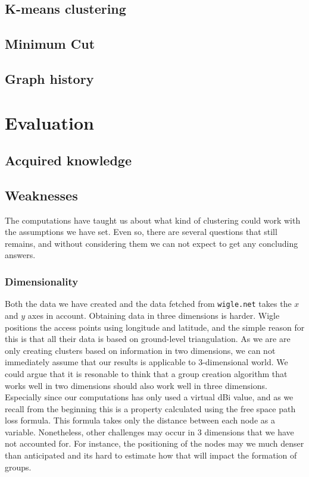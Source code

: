 
\subsection{K-means clustering}

\subsection{Minimum Cut}

\subsection{Graph history}



\section{Evaluation}
\subsection{Acquired knowledge}
\subsection{Weaknesses}
The computations have taught us about what kind of clustering could work with the assumptions we have set. Even so, there are several questions that still remains,
and without considering them we can not expect to get any concluding answers. 

\subsubsection{Dimensionality} 
Both the data we have created and the data fetched from \verb|wigle.net| takes the $x$ and $y$ axes in account. Obtaining data in three dimensions is harder.
Wigle positions the access points using longitude and latitude, and the simple reason for this is that all their data is based on ground-level triangulation.
As we are are only creating clusters based on information in two dimensions, we can not immediately assume that our results is applicable to 3-dimensional world. 
We could argue that it is resonable to think that a group creation algorithm that works well in two dimensions should also work well in three dimensions. Especially since our computations has only
used a virtual dBi value, and as we recall from the beginning this is a property calculated using the free space path loss formula. This formula takes only the distance between each node
as a variable. Nonetheless, other challenges may occur in 3 dimensions that we have not accounted for. For instance, 
the positioning of the nodes may we much denser than anticipated and its hard to estimate how that will impact the formation of groups. 

